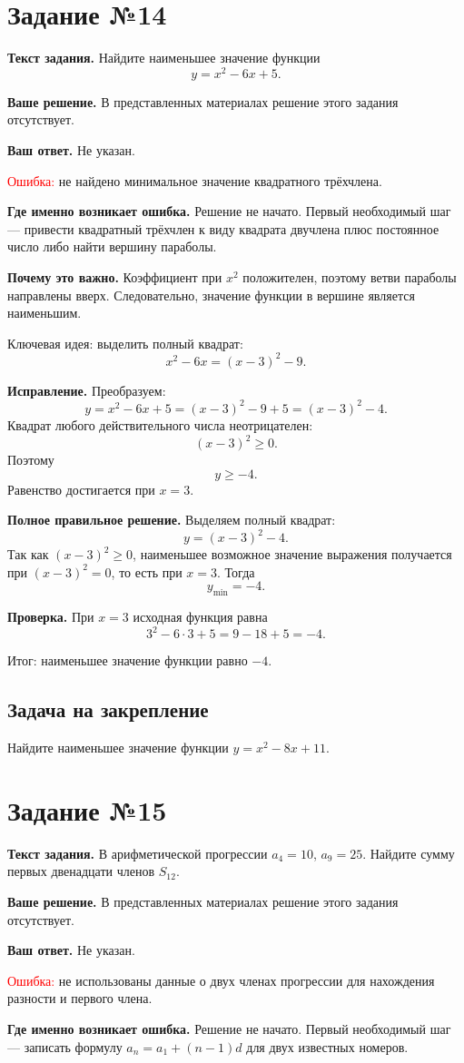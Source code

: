 \documentclass[12pt,a4paper]{article}
\newcommand{\err}{\textcolor{red}{Ошибка:}}
\newcommand{\idea}{\textcolor{blue!60!black}{Ключевая идея:}}
\newcommand{\result}{\textcolor{teal!60!black}{Итог:}}
\newcommand{\tasktitle}[1]{\phantomsection\label{task:#1}\section*{Задание №#1}}
\begin{document}
\newpage
\tasktitle{14}
\textbf{Текст задания.} Найдите наименьшее значение функции
\[
y=x^2-6x+5.
\]

\textbf{Ваше решение.} В представленных материалах решение этого задания отсутствует.

\textbf{Ваш ответ.} Не указан.

\err{} не найдено минимальное значение квадратного трёхчлена.

\textbf{Где именно возникает ошибка.} Решение не начато. Первый необходимый шаг --- привести квадратный трёхчлен к виду квадрата двучлена плюс постоянное число либо найти вершину параболы.

\textbf{Почему это важно.} Коэффициент при $x^2$ положителен, поэтому ветви параболы направлены вверх. Следовательно, значение функции в вершине является наименьшим.

\idea{} выделить полный квадрат:
\[
x^2-6x=(x-3)^2-9.
\]

\textbf{Исправление.} Преобразуем:
\[
y=x^2-6x+5=(x-3)^2-9+5=(x-3)^2-4.
\]
Квадрат любого действительного числа неотрицателен:
\[
(x-3)^2\geq0.
\]
Поэтому
\[
y\geq-4.
\]
Равенство достигается при $x=3$.

\textbf{Полное правильное решение.} Выделяем полный квадрат:
\[
y=(x-3)^2-4.
\]
Так как $(x-3)^2\geq0$, наименьшее возможное значение выражения получается при $(x-3)^2=0$, то есть при $x=3$. Тогда
\[
y_{\min}=-4.
\]

\textbf{Проверка.} При $x=3$ исходная функция равна
\[
3^2-6\cdot3+5=9-18+5=-4.
\]

\result{} наименьшее значение функции равно $-4$.

\subsection*{Задача на закрепление}
Найдите наименьшее значение функции $y=x^2-8x+11$.

\newpage
\tasktitle{15}
\textbf{Текст задания.} В арифметической прогрессии $a_4=10$, $a_9=25$. Найдите сумму первых двенадцати членов $S_{12}$.

\textbf{Ваше решение.} В представленных материалах решение этого задания отсутствует.

\textbf{Ваш ответ.} Не указан.

\err{} не использованы данные о двух членах прогрессии для нахождения разности и первого члена.

\textbf{Где именно возникает ошибка.} Решение не начато. Первый необходимый шаг --- записать формулу $a_n=a_1+(n-1)d$ для двух известных номеров.
\end{document}
